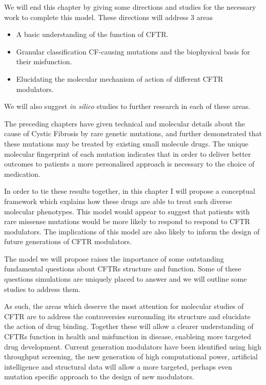 We will end this chapter by giving some directions and studies for the necessary work to complete this model. These directions will address 3 areas 

\begin{itemize}
	\item A basic understanding of the function of CFTR.
	\item Granular classification CF-causing mutations and the biophysical basis for their misfunction.
	\item Elucidating the molecular mechanism of action of different CFTR modulators. 
\end{itemize}

We will also suggest \textit{in silico} studies to further research in each of these areas.

The preceding chapters have given technical and molecular details about the cause of Cystic Fibrosis by rare genetic mutations, and further demonstrated that these mutations may be treated by existing small molecule drugs. The unique molecular fingerprint of each mutation indicates that in order to deliver better outcomes to patients a more personalised approach is necessary to the choice of medication. 

In order to tie these results together, in this chapter I will propose a conceptual framework which explains how these drugs are able to treat such diverse molecular phenotypes. This model would appear to suggest that patients with rare missense mutations would be more likely to respond to respond to CFTR modulators. The implications of this model are also likely to inform the design of future generations of CFTR modulators. 

The model we will propose raises the importance of some outstanding fundamental questions about CFTRs structure and function. Some of these questions simulations are uniquely placed to answer and we will outline some studies to address them. 

As such, the areas which deserve the most attention for molecular studies of CFTR are to address the controversies surrounding its structure and elucidate the action of drug binding. Together these will allow a clearer understanding of CFTRs function in health and misfunction in disease, enableing more targeted drug development. Current generation modulators have been identified using high throughput screening, the new generation of high computational power, artificial intelligence and structural data will allow a more targeted, perhaps even mutation specific approach to the design of new modulators.

